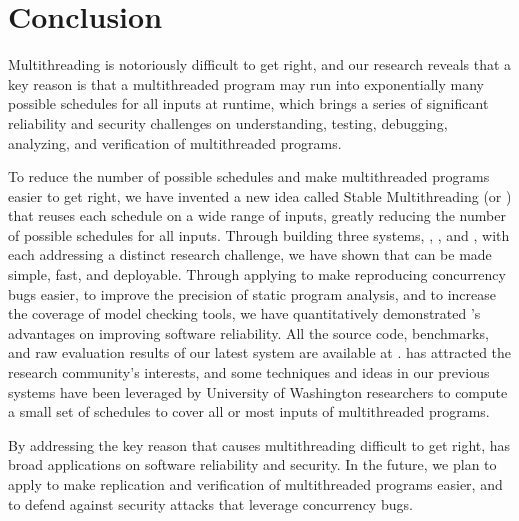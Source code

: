 \chapter{Conclusion} \label{sec:conclusion}

Multithreading is notoriously difficult to get right, and our research reveals
that a key reason is that a multithreaded program may run into exponentially 
many
possible schedules for all inputs at runtime, which brings a series of
significant reliability and security challenges on understanding,
testing, debugging, analyzing, and verification of multithreaded
programs.

To reduce the number of possible schedules and make multithreaded
programs easier to get right, we have invented a new idea called Stable
Multithreading (or \smt) that reuses each schedule on a wide range of inputs,
greatly reducing the number of possible schedules for all inputs. Through
building three \smt systems, \tern, \peregrine, and \parrot, with each 
addressing
a distinct research challenge, we have shown that \smt can be made simple, fast,
and deployable. Through applying \smt to make reproducing concurrency bugs
easier, to improve the precision of static program analysis, and to increase the
coverage of model checking tools, we have quantitatively demonstrated \smt's 
advantages on improving software reliability. All the source code,
benchmarks, and raw evaluation results of our latest \smt system \parrot are
available at \github. \smt has attracted the research community's interests, 
and some techniques and ideas in our previous systems have been leveraged by 
University of Washington researchers to compute a small set of schedules to 
cover all or most inputs of multithreaded programs.

By addressing the key reason that causes multithreading difficult to get right,
\smt has broad applications on software reliability and security. In the 
future, we plan to apply \smt to make replication and verification of 
multithreaded programs easier, and to defend against security attacks 
that leverage concurrency bugs.